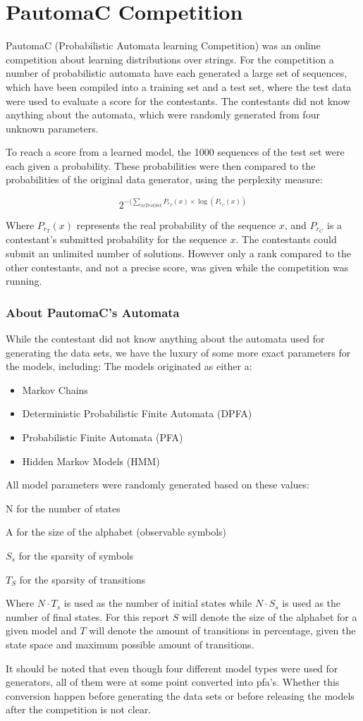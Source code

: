 \section{PautomaC Competition}
\label{sec:PautomaC}

PautomaC (Probabilistic Automata learning Competition) was an online competition about learning distributions over strings. For the competition a number of probabilistic automata have each generated a large set of sequences, which have been compiled into a training set and a test set, where the test data were used to evaluate a score for the contestants.
The contestants did not know anything about the automata, which were randomly generated from four unknown parameters.

To reach a score from a learned model, the 1000 sequences of the test set were each given a probability. These probabilities were then compared to the probabilities of the original data generator, using the perplexity measure:

\begin{equation} \label{eq:perplexity}
2^{-(\sum_{x\epsilon TestSet}P_{r_{T}}(x)\times\log(P_{r_{C}}(x))}
\end{equation}

Where $P_{r_{T}}(x)$ represents the real probability of the
sequence $x$, and $P_{r_{C}}$ is a contestant's submitted probability for the sequence $x$.
The contestants could submit an unlimited number of solutions. However only a rank compared to the other contestants, and not a precise score, was given while the competition was running.

\subsubsection{About PautomaC's Automata}
While the contestant did not know anything about the automata used for generating the data sets, we have the luxury of some more exact parameters for the models, including:
The models originated as either a:
\begin{itemize}
\item Markov Chains
\item Deterministic Probabilistic Finite Automata (DPFA)
\item Probabilistic Finite Automata (PFA)
\item Hidden Markov Models (HMM)
\end{itemize}
All model parameters were randomly generated based on these values:
\begin{description}
\item N for the number of states
\item A for the size of the alphabet (observable symbols)
\item $S_s$ for the sparsity of symbols
\item $T_S$ for the sparsity of transitions
\end{description}
Where $N \cdot T_s$ is used as the number of initial states while $N \cdot S_s$ is used as the number of final states. For this report $S$ will denote the size of the alphabet for a given model and $T$ will denote the amount of transitions in percentage, given the state space and maximum possible amount of transitions.

It should be noted that even though four different model types were used for generators, all of them were at some point converted into \gls{pfa}'s. Whether this conversion happen before generating the data sets or before releasing the models after the competition is not clear.